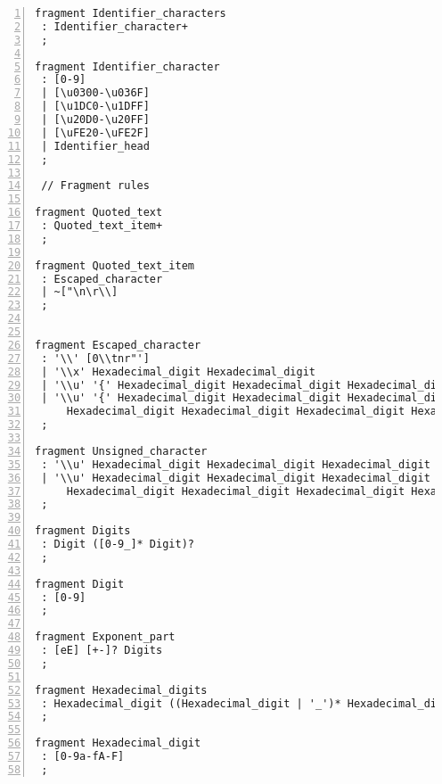 \begin{lstlisting}[numbers=left,basicstyle=\ttfamily\scriptsize]
fragment Identifier_characters
 : Identifier_character+
 ;

fragment Identifier_character
 : [0-9]
 | [\u0300-\u036F]
 | [\u1DC0-\u1DFF]
 | [\u20D0-\u20FF]
 | [\uFE20-\uFE2F]
 | Identifier_head
 ;

 // Fragment rules

fragment Quoted_text
 : Quoted_text_item+
 ;

fragment Quoted_text_item
 : Escaped_character
 | ~["\n\r\\]
 ;
    

fragment Escaped_character
 : '\\' [0\\tnr"']
 | '\\x' Hexadecimal_digit Hexadecimal_digit
 | '\\u' '{' Hexadecimal_digit Hexadecimal_digit Hexadecimal_digit Hexadecimal_digit '}'
 | '\\u' '{' Hexadecimal_digit Hexadecimal_digit Hexadecimal_digit Hexadecimal_digit
     Hexadecimal_digit Hexadecimal_digit Hexadecimal_digit Hexadecimal_digit '}'
 ;

fragment Unsigned_character
 : '\\u' Hexadecimal_digit Hexadecimal_digit Hexadecimal_digit Hexadecimal_digit
 | '\\u' Hexadecimal_digit Hexadecimal_digit Hexadecimal_digit Hexadecimal_digit
     Hexadecimal_digit Hexadecimal_digit Hexadecimal_digit Hexadecimal_digit
 ;

fragment Digits
 : Digit ([0-9_]* Digit)?
 ;

fragment Digit
 : [0-9]
 ;

fragment Exponent_part
 : [eE] [+-]? Digits
 ;

fragment Hexadecimal_digits
 : Hexadecimal_digit ((Hexadecimal_digit | '_')* Hexadecimal_digit)?
 ;

fragment Hexadecimal_digit
 : [0-9a-fA-F]
 ;
\end{lstlisting}

